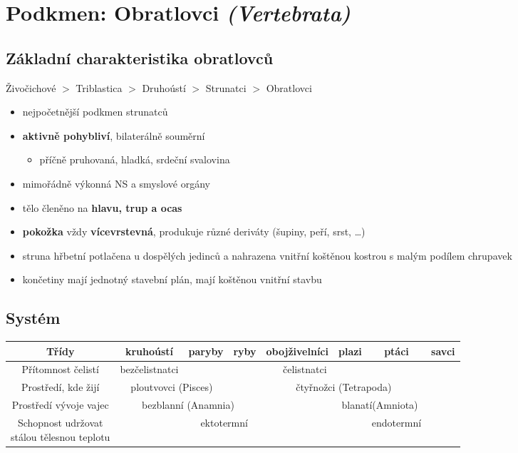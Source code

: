\section{Podkmen: Obratlovci \textit{(Vertebrata)}}
\subsection{Základní charakteristika obratlovců}
Živočichové $>$ Triblastica $>$ Druhoústí $>$ Strunatci $>$ Obratlovci
\begin{itemize}
\item nejpočetnější podkmen strunatců
\item \textbf{aktivně pohybliví}, bilaterálně souměrní
	\begin{itemize}
	\item příčně pruhovaná, hladká, srdeční svalovina
	\end{itemize}
\item mimořádně výkonná NS a smyslové orgány
\item tělo členěno na \textbf{hlavu, trup a ocas}
\item \textbf{pokožka} vždy \textbf{vícevrstevná}, produkuje různé deriváty (šupiny, peří, srst, \ldots)
\item struna hřbetní potlačena u dospělých jedinců a nahrazena vnitřní koštěnou kostrou s malým podílem chrupavek
\item končetiny mají jednotný stavební plán, mají koštěnou vnitřní stavbu
\end{itemize}

\subsection{Systém}
\begin{tabular}{|c|c|c|c|c|c|c|c|}
\hline
Třídy&kruhoústí&paryby&ryby&obojživelníci&plazi&ptáci&savci		\\ \hline
Přítomnost čelistí&bezčelistnatci& \multicolumn{5}{c}{čelistnatci} &		\\ \hline
Prostředí, kde žijí & \multicolumn{2}{c}{ploutvovci (Pisces)} && \multicolumn{3}{c}{čtyřnožci (Tetrapoda)} &\\ \hline
Prostředí vývoje vajec & \multicolumn{3}{c}{bezblanní (Anamnia)} && \multicolumn{2}{c}{blanatí(Amniota)} &		\\ \hline
\makecell{Schopnost udržovat \\ stálou tělesnou teplotu}	& \multicolumn{4}{c}{ektotermní} && \multicolumn{1}{c}{endotermní} &	\\ \hline
\end{tabular}

